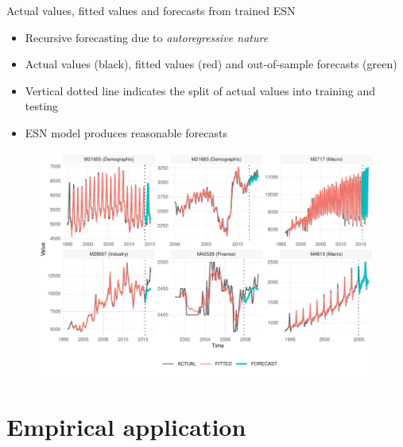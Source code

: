 \documentclass[aspectratio=169]{beamer}
\begin{document}
\begin{frame}[t]{Actual values, fitted values and forecasts from trained ESN}
    \begin{minipage}[t]{0.3\textwidth}
        \vspace{0pt}
        \begin{itemize}
        	\item Recursive forecasting due to \textit{autoregressive nature}
            \item Actual values (black), fitted values (red) and out-of-sample forecasts (green)
			\item Vertical dotted line indicates the split of actual values into training and testing
			\item ESN model produces reasonable forecasts
        \end{itemize}
    \end{minipage}%
    \hfill
    \begin{minipage}[t]{0.7\textwidth}
        \vspace{0pt}
 		\begin{figure}[H]
		\center
			\includegraphics[scale=0.7]{figures/figure_07_model_forecast_sample_wide.pdf}
		\end{figure}
    \end{minipage}
\end{frame}



\section{Empirical application}
\end{document}
